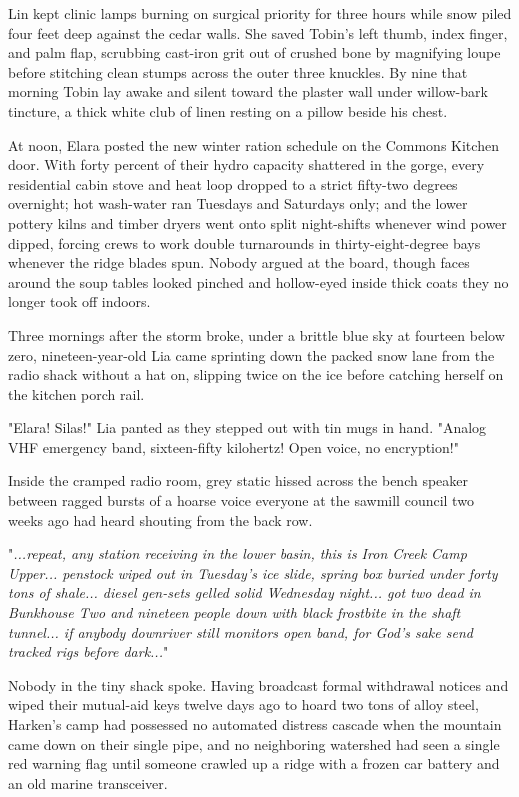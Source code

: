 \bigskip

Lin kept clinic lamps burning on surgical priority for three hours while snow piled four feet deep against the cedar walls. She saved Tobin's left thumb, index finger, and palm flap, scrubbing cast-iron grit out of crushed bone by magnifying loupe before stitching clean stumps across the outer three knuckles. By nine that morning Tobin lay awake and silent toward the plaster wall under willow-bark tincture, a thick white club of linen resting on a pillow beside his chest.

At noon, Elara posted the new winter ration schedule on the Commons Kitchen door. With forty percent of their hydro capacity shattered in the gorge, every residential cabin stove and heat loop dropped to a strict fifty-two degrees overnight; hot wash-water ran Tuesdays and Saturdays only; and the lower pottery kilns and timber dryers went onto split night-shifts whenever wind power dipped, forcing crews to work double turnarounds in thirty-eight-degree bays whenever the ridge blades spun. Nobody argued at the board, though faces around the soup tables looked pinched and hollow-eyed inside thick coats they no longer took off indoors.

Three mornings after the storm broke, under a brittle blue sky at fourteen below zero, nineteen-year-old Lia came sprinting down the packed snow lane from the radio shack without a hat on, slipping twice on the ice before catching herself on the kitchen porch rail.

"Elara! Silas!" Lia panted as they stepped out with tin mugs in hand. "Analog VHF emergency band, sixteen-fifty kilohertz! Open voice, no encryption!"

Inside the cramped radio room, grey static hissed across the bench speaker between ragged bursts of a hoarse voice everyone at the sawmill council two weeks ago had heard shouting from the back row.

"\textit{...repeat, any station receiving in the lower basin, this is Iron Creek Camp Upper... penstock wiped out in Tuesday's ice slide, spring box buried under forty tons of shale... diesel gen-sets gelled solid Wednesday night... got two dead in Bunkhouse Two and nineteen people down with black frostbite in the shaft tunnel... if anybody downriver still monitors open band, for God's sake send tracked rigs before dark...}"

Nobody in the tiny shack spoke. Having broadcast formal withdrawal notices and wiped their mutual-aid keys twelve days ago to hoard two tons of alloy steel, Harken's camp had possessed no automated distress cascade when the mountain came down on their single pipe, and no neighboring watershed had seen a single red warning flag until someone crawled up a ridge with a frozen car battery and an old marine transceiver.

